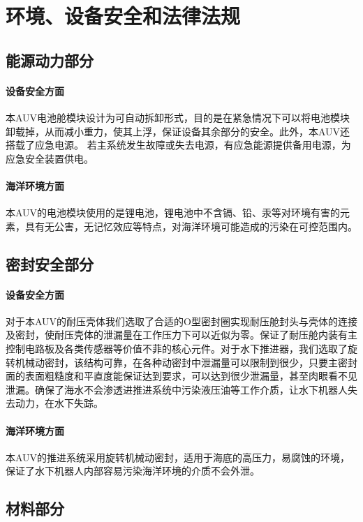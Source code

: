 \documentclass{ctexart}
\begin{document}
    \section{环境、设备安全和法律法规}
    \subsection{能源动力部分}
    \paragraph{设备安全方面} 
        本AUV电池舱模块设计为可自动拆卸形式，目的是在紧急情况下可以将电池模块卸载掉，从而减小重力，使其上浮，保证设备其余部分的安全。此外，本AUV还搭载了应急电源。
        若主系统发生故障或失去电源，有应急能源提供备用电源，为应急安全装置供电。
    \paragraph{海洋环境方面}
        本AUV的电池模块使用的是锂电池，锂电池中不含镉、铅、汞等对环境有害的元素，具有无公害，无记忆效应等特点，对海洋环境可能造成的污染在可控范围内。
    \subsection{密封安全部分}
    \paragraph{设备安全方面} 
        对于本AUV的耐压壳体我们选取了合适的O型密封圈实现耐压舱封头与壳体的连接及密封，使耐压壳体的泄漏量在工作压力下可以近似为零。保证了耐压舱内装有主控制电路板及各类传感器等价值不菲的核心元件。对于水下推进器，我们选取了旋转机械动密封，该结构可靠，在各种动密封中泄漏量可以限制到很少，只要主密封面的表面粗糙度和平直度能保证达到要求，可以达到很少泄漏量，甚至肉眼看不见泄漏。确保了海水不会渗透进推进系统中污染液压油等工作介质，让水下机器人失去动力，在水下失踪。
    \paragraph{海洋环境方面}  
        本AUV的推进系统采用旋转机械动密封，适用于海底的高压力，易腐蚀的环境，保证了水下机器人内部容易污染海洋环境的介质不会外泄。
    \subsection{材料部分}
\end{document}
